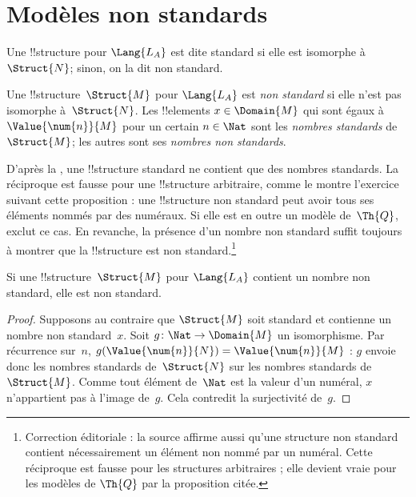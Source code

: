 \documentclass[../../../include/open-logic-section]{subfiles}
\begin{document}
\section{Modèles non standards}

\begin{explain}
Une !!{structure} pour $\Lang{L_A}$ est dite standard
si elle est isomorphe à~$\Struct{N}$; sinon, on
la dit non standard.
\end{explain}

\begin{defn}
Une !!{structure}~$\Struct{M}$ pour $\Lang{L_A}$
est \emph{non standard} si elle n'est pas isomorphe
à~$\Struct{N}$. Les !!{element}s $x\in\Domain{M}$
qui sont égaux à $\Value{\num{n}}{M}$ pour un certain
$n\in\Nat$ sont les \emph{nombres standards}
de~$\Struct{M}$; les autres sont ses
\emph{nombres non standards}.
\end{defn}

\begin{explain}
D'après la , une
!!{structure} standard ne contient que des nombres
standards. La réciproque est fausse pour une
!!{structure} arbitraire, comme le montre l'exercice
suivant cette proposition : une !!{structure} non
standard peut avoir tous ses éléments nommés par
des numéraux. Si elle est en outre un modèle
de~$\Th{Q}$,  exclut
ce cas. En revanche, la présence d'un nombre
non standard suffit toujours à montrer que
la !!{structure} est non standard.\footnote{Correction éditoriale : la source affirme aussi qu'une structure non standard contient nécessairement un élément non nommé par un numéral. Cette réciproque est fausse pour les structures arbitraires ; elle devient vraie pour les modèles de $\Th{Q}$ par la proposition citée.}
\end{explain}

\begin{prop}
Si une !!{structure}~$\Struct{M}$ pour $\Lang{L_A}$
contient un nombre non standard, elle est non standard.
\end{prop}

\begin{proof}
Supposons au contraire que $\Struct{M}$ soit
standard et contienne un nombre non standard~$x$.
Soit $g\colon\Nat\to\Domain{M}$ un isomorphisme.
Par récurrence sur~$n$,
$g(\Value{\num{n}}{N})=\Value{\num{n}}{M}$ :
$g$ envoie donc les nombres standards de~$\Struct{N}$
sur les nombres standards de~$\Struct{M}$. Comme
tout élément de~$\Nat$ est la valeur d'un numéral,
$x$ n'appartient pas à l'image de~$g$. Cela
contredit la surjectivité de~$g$.
\end{proof}
\end{document}
